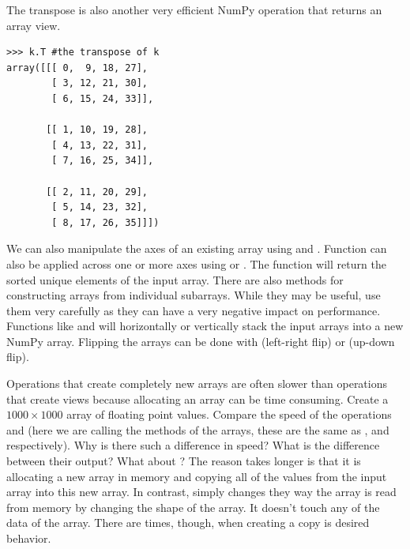 The transpose is also another very efficient NumPy operation that returns an array view.   
\begin{lstlisting}
>>> k.T #the transpose of k
array([[[ 0,  9, 18, 27],
        [ 3, 12, 21, 30],
        [ 6, 15, 24, 33]],

       [[ 1, 10, 19, 28],
        [ 4, 13, 22, 31],
        [ 7, 16, 25, 34]],

       [[ 2, 11, 20, 29],
        [ 5, 14, 23, 32],
        [ 8, 17, 26, 35]]])
\end{lstlisting}
We can also manipulate the axes of an existing array using  and .  Function can also be applied across one or more axes using  or .  
The function  will return the sorted unique elements of the input array.
There are also methods for constructing arrays from individual subarrays.  While they may be useful, use them very carefully as they can have a very negative impact on performance.  Functions like  and  will horizontally or vertically stack the input arrays into a new NumPy array.
Flipping the arrays can be done with  (left-right flip) or  (up-down flip).

\begin{problem}
Operations that create completely new arrays are often slower than operations that create views because allocating an array can be time consuming.
Create a $1000 \times 1000$ array  of floating point values.
Compare the speed of the operations  and  (here we are calling the methods of the arrays, these are the same as , and  respectively).
Why is there such a difference in speed?
What is the difference between their output?
What about ?
The reason  takes longer is that it is allocating a new array in memory and copying all of the values from the input array into this new array.  In contrast,  simply changes they way the array is read from memory by changing the shape of the array.  It doesn't touch any of the data of the array.  There are times, though, when creating a copy is desired behavior.
\end{problem}

